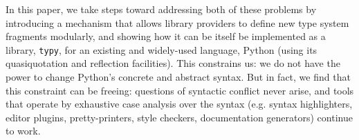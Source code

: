 \documentclass[9pt]{sigplanconf}
\begin{document}

In this paper, we take steps toward addressing both of these problems by introducing a mechanism that allows library providers to define new type system fragments modularly, and showing how it can be itself be implemented as a library, \texttt{typy}, for an existing and widely-used language, Python (using its quasiquotation and reflection facilities). This constrains us: we do not have the power to change Python's concrete and abstract syntax. But in fact, we find that this constraint  can be freeing: questions of syntactic conflict never arise, and tools that operate by exhaustive case analysis over the syntax (e.g. syntax highlighters, editor plugins, pretty-printers, style checkers, documentation generators) continue to work. %
\end{document}
